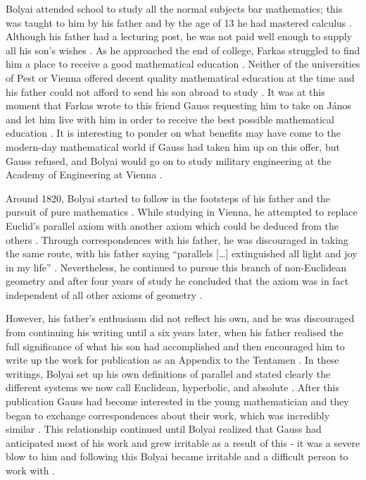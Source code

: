 \documentclass{article}
\begin{document}
Bolyai attended school to study all the normal subjects bar mathematics; this was taught to him by his father and by the age of 13 he had mastered calculus \cite{standrewsjanos}. Although his father had a lecturing post, he was not paid well enough to supply all his son’s wishes \cite{standrewsjanos}. As he approached the end of college, Farkas struggled to find him a place to receive a good mathematical education \cite{standrewsjanos}. Neither of the universities of Pest or Vienna offered decent quality mathematical education at the time and his father could not afford to send his son abroad to study \cite{standrewsjanos}. It was at this moment that Farkas wrote to this friend Gauss requesting him to take on János and let him live with him in order to receive the best possible mathematical education \cite{standrewsjanos}. It is interesting to ponder on what benefits may have come to the modern-day mathematical world if Gauss had taken him up on this offer, but Gauss refused, and Bolyai would go on to study military engineering at the Academy of Engineering at Vienna \cite{standrewsjanos}. 

Around 1820, Bolyai started to follow in the footsteps of his father and the pursuit of pure mathematics \cite{standrewsbolyai}. While studying in Vienna, he attempted to replace Euclid’s parallel axiom with another axiom which could be deduced from the others \cite{standrewsbolyai}. Through correspondences with his father, he was discouraged in taking the same route, with his father saying “parallels […] extinguished all light and joy in my life” \cite{standrewsjanos}. Nevertheless, he continued to pursue this branch of non-Euclidean geometry and after four years of study he concluded that the axiom was in fact independent of all other axioms of geometry \cite{standrewsbolyai}. 

However, his father’s enthusiasm did not reflect his own, and he was discouraged from continuing his writing until a six years later, when his father realised the full significance of what his son had accomplished and then encouraged him to write up the work for publication as an Appendix to the Tentamen \cite{standrewsbolyai}. In these writings, Bolyai set up his own definitions of parallel and stated clearly the different systems we now call Euclidean, hyperbolic, and absolute \cite{standrewsbolyai}. After this publication Gauss had become interested in the young mathematician and they began to exchange correspondences about their work, which was incredibly similar \cite{standrewsbolyai}. This relationship continued until Bolyai realized that Gauss had anticipated most of his work and grew irritable as a result of this - it was a severe blow to him and following this Bolyai became irritable and a difficult person to work with \cite{standrewsbolyai}. 
\end{document}
